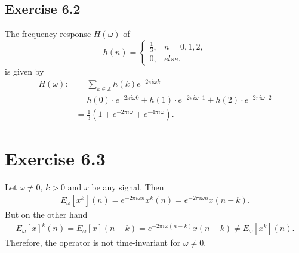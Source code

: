 \documentclass[12pt]{article}
\begin{document}
\begin{itemize}
\section*{Exercise 6.2}
The frequency response $H(\omega)$ of
\[ h(n) = \begin{cases}
            \frac{1}{3}, &n=0,1,2,\\
            0, &else.
          \end{cases} \]
is given by
\begin{align*}
    H(\omega):&=\sum_{k\in\mathbb{Z}}h(k)e^{-2\pi i \omega k}\\
    &=h(0)\cdot e^{-2\pi i \omega 0} + h(1)\cdot e^{-2\pi i \omega\cdot 1} + h(2)\cdot e^{-2\pi i \omega \cdot 2}\\
    &=\frac{1}{3}\left(1+e^{-2\pi i \omega}+e^{-4\pi i \omega}\right).
\end{align*}
    
\end{itemize}


\section*{Exercise 6.3}
Let $\omega \neq 0$, $k > 0$ and $x$ be any signal. Then
\begin{align*}
E_{\omega}\left[x^{k} \right](n) = e^{-2\pi i\omega n}x^{k}(n) = e^{-2\pi i\omega n} x(n-k).
\end{align*}
But on the other hand
\begin{align*}
E_{\omega}\left[x \right]^{k}(n) = E_{\omega}[x](n-k) = e^{-2\pi i \omega(n-k)}x(n-k) \neq E_{\omega}\left[x^{k} \right](n).
\end{align*}
Therefore, the operator is not time-invariant for $\omega \neq 0$.
\end{document}
